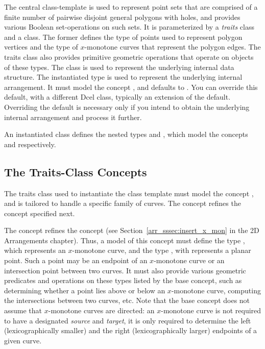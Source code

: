 The central class-template  is 
used to represent point sets that are comprised of a finite number of 
pairwise disjoint general polygons with holes, and provides various 
Boolean set-operations on such sets. It is parameterized by a {\em traits}
class and a \dcel{} class. The former defines the type of points used 
to represent polygon vertices and the type of $x$-monotone curves that 
represent the polygon edges. The traits class also provides primitive 
geometric operations that operate on objects of these types. 
The \dcel{} class is used to represent the underlying internal 
 data structure. The instantiated  type is 
used to represent the underlying internal arrangement. It must model the 
concept , and defaults to .
You can override this default, with a different {\sc Dcel} class, typically
an extension of the default. Overriding the default is necessary only if 
you intend to obtain the underlying internal arrangement and process it further.

An instantiated
 class defines the nested types 
 and
, which model
the concepts  and
 respectively.

\subsection{The Traits-Class Concepts\label{bso_ssec:traits_concepts}}

The traits class used to instantiate the 
class template must model the concept ,
and is tailored to handle a specific family of curves. The concept
 refines the concept
 specified next.

The concept  refines the 
concept  (see 
Section~\ref{arr_sssec:insert_x_mon} in the 2D Arrangements chapter).
Thus, a model of this concept must define the type , 
which represents an $x$-monotone curve, and the type , 
with represents a planar point. Such a point may be an endpoint of an
$x$-monotone curve or an intersection point between two curves.
It must also provide various geometric predicates and operations 
on these types listed by the base concept, such as determining whether
a point lies above or below an $x$-monotone curve, computing the
intersections between two curves, etc. Note that the base concept does
not assume that $x$-monotone curves are directed: an $x$-monotone
curve is not required to have a designated {\em source} and {\em
target}, it is only required to determine the left (lexicographically
smaller) and the right (lexicographically larger) endpoints of a given
curve.

